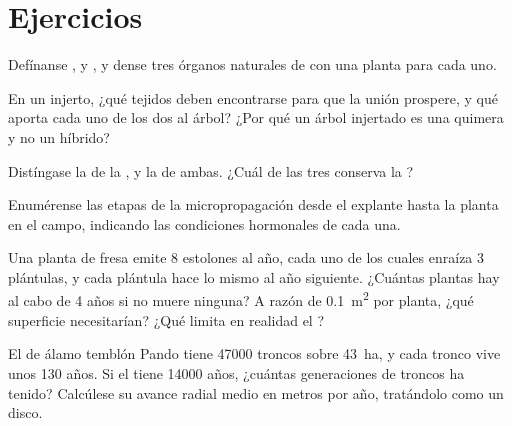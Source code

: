 \section{Ejercicios}

\begin{exercise}[$\star$]\label{exo:b2:asexual-reproduction:1}
Defínanse ,  y , y dense tres órganos naturales de
 con una planta para cada uno.
\end{exercise}

\begin{exercise}[$\star$]\label{exo:b2:asexual-reproduction:2}
En un injerto, ¿qué tejidos deben encontrarse para que la unión prospere,
y qué aporta cada uno de los dos al árbol? ¿Por qué un árbol injertado
es una quimera y no un híbrido?
\end{exercise}

\begin{exercise}[$\star$]\label{exo:b2:asexual-reproduction:3}
Distíngase la  de la , y la
 de ambas. ¿Cuál de las tres conserva la ?
\end{exercise}

\begin{exercise}[$\star$]\label{exo:b2:asexual-reproduction:4}
Enumérense las etapas de la micropropagación desde el explante hasta la
planta en el campo, indicando las condiciones hormonales de cada una.
\end{exercise}

\begin{exercise}[$\star\star$]\label{exo:b2:asexual-reproduction:5}
Una planta de fresa emite 8 estolones al año, cada uno de los cuales
enraíza 3 plántulas, y cada plántula hace lo mismo al año siguiente.
¿Cuántas plantas hay al cabo de 4 años si no muere ninguna? A razón de
\qty{0.1}{m^2} por planta, ¿qué superficie necesitarían? ¿Qué limita en
realidad el ?
\end{exercise}

\begin{exercise}[$\star\star$]\label{exo:b2:asexual-reproduction:6}
El  de álamo temblón Pando tiene \num{47000} troncos sobre
\qty{43}{ha}, y cada tronco vive unos \num{130} años. Si el  tiene
\num{14000} años, ¿cuántas generaciones de troncos ha tenido? Calcúlese
su avance radial medio en metros por año, tratándolo como un disco.
\end{exercise}

